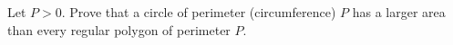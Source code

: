 Let $P>0$. Prove that a circle of perimeter (circumference) $P$ has a larger area than every regular polygon of perimeter $P$.
